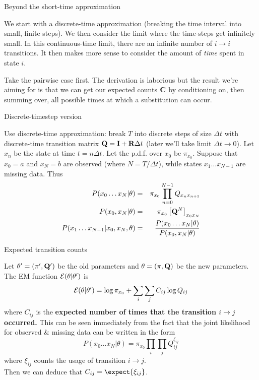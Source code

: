 \documentclass{beamer}
\begin{document}
\begin{frame}{Beyond the short-time approximation}
 \itemb
 \item We start with a discrete-time approximation (breaking the time interval into small, finite steps).
We then consider the limit where the time-steps get infinitely small.
In this continuous-time limit, there are an infinite number of $i \to i$ transitions.
It then makes more sense to consider the amount of {\em time} spent in state $i$.
\item Take the pairwise case first.
The derivation is laborious but the result we're aiming for is that we can get our expected counts ${\bf C}$
by conditioning on, then summing over, all possible times at which a substitution can occur.
 \iteme
\end{frame}

\begin{frame}{Discrete-timestep version}
 \itemb
 \item Use discrete-time approximation: break $T$ into discrete steps of size $\Delta t$
with discrete-time transition matrix ${\bf Q} = {\bf I} + {\bf R} \Delta t$
(later we'll take limit $\Delta t \to 0$).
Let $x_n$ be the state at time $t = n \Delta t$.
Let the p.d.f. over $x_0$ be $\pi_{x_0}$.
Suppose that $x_0=a$ and $x_N=b$ are observed (where $N = T / \Delta t$),
while states $x_1 \ldots x_{N-1}$ are missing data.
Thus
\begin{eqnarray*}
P(x_0 \ldots x_N | \theta) & = & \pi_{x_0} \prod_{n=0}^{N-1} Q_{x_n x_{n+1}} \\
P(x_0, x_N | \theta) & = & \pi_{x_0} \left[ {\bf Q}^N \right]_{x_0 x_N} \\
\displaystyle
P(x_1 \ldots x_{N-1} | x_0, x_N, \theta) & = & \frac{P(x_0 \ldots x_N | \theta)}{P(x_0, x_N | \theta)}
\end{eqnarray*}
 \iteme
\end{frame}

\begin{frame}{Expected transition counts}
 \itemb
 \item Let $\theta' = (\pi', {\bf Q}')$ be the old parameters and $\theta = (\pi, {\bf Q})$ be the new parameters.
The EM function ${\cal E}(\theta|\theta')$ is
\[
{\cal E}(\theta|\theta') = \log \pi_{x_0} + \sum_i \sum_j C_{ij} \log Q_{ij}
\]
where $C_{ij}$ is the {\bf expected number of times that the transition $i \to j$ occurred.}
This can be seen immediately from the fact that the joint likelihood for observed \& missing data can be written in the form
\[
P(x_0 \ldots x_N | \theta) = \pi_{x_0} \prod_i \prod_j Q_{ij}^{\xi_{ij}}
\]
where $\xi_{ij}$ counts the usage of transition $i \to j$. \\
Then we can deduce that $C_{ij} = \expect{\xi_{ij}}$.
 \iteme
\end{frame}
\end{document}
